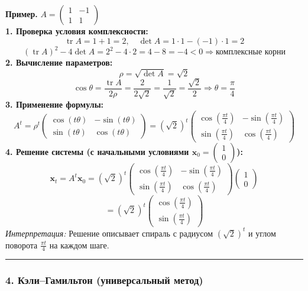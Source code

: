 \textbf{Пример.} $A = \begin{pmatrix} 1 & -1 \\ 1 & 1 \end{pmatrix}$\\
\textbf{1. Проверка условия комплексности:}
$$\operatorname{tr}A = 1 + 1 = 2, \quad \det A = 1 \cdot 1 - (-1) \cdot 1 = 2$$
$$(\operatorname{tr}A)^2 - 4\det A = 2^2 - 4 \cdot 2 = 4 - 8 = -4 < 0 \Rightarrow \text{комплексные корни}$$
\textbf{2. Вычисление параметров:}
$$\rho = \sqrt{\det A} = \sqrt{2}$$
$$\cos\theta = \frac{\operatorname{tr}A}{2\rho} = \frac{2}{2\sqrt{2}} = \frac{1}{\sqrt{2}} = \frac{\sqrt{2}}{2} \Rightarrow \theta = \frac{\pi}{4}$$
\textbf{3. Применение формулы:}
$$A^t = \rho^t \begin{pmatrix} \cos(t\theta) & -\sin(t\theta) \\ \sin(t\theta) & \cos(t\theta) \end{pmatrix} = (\sqrt{2})^t \begin{pmatrix} \cos\left(\frac{\pi t}{4}\right) & -\sin\left(\frac{\pi t}{4}\right) \\ \sin\left(\frac{\pi t}{4}\right) & \cos\left(\frac{\pi t}{4}\right) \end{pmatrix}$$
\textbf{4. Решение системы (с начальными условиями $\mathbf{x}_0 = \begin{pmatrix} 1 \\ 0 \end{pmatrix}$):}
$$\mathbf{x}_t = A^t\mathbf{x}_0 = (\sqrt{2})^t \begin{pmatrix} \cos\left(\frac{\pi t}{4}\right) & -\sin\left(\frac{\pi t}{4}\right) \\ \sin\left(\frac{\pi t}{4}\right) & \cos\left(\frac{\pi t}{4}\right) \end{pmatrix}\begin{pmatrix} 1 \\ 0 \end{pmatrix}$$
$$= (\sqrt{2})^t \begin{pmatrix} \cos\left(\frac{\pi t}{4}\right) \\ \sin\left(\frac{\pi t}{4}\right) \end{pmatrix}$$
\textit{Интерпретация:} Решение описывает спираль с радиусом $(\sqrt{2})^t$ и углом поворота $\frac{\pi t}{4}$ на каждом шаге.

\bigskip
\hrule
\bigskip

\subsubsection*{4. Кэли–Гамильтон (универсальный метод)}

